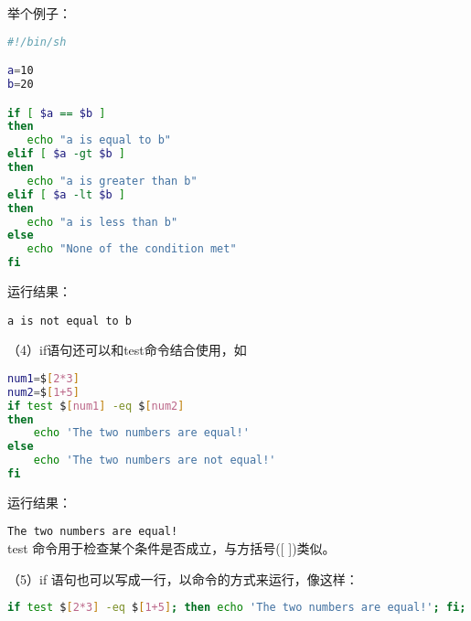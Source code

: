 举个例子：
\begin{lstlisting}[language=sh]
#!/bin/sh

a=10
b=20

if [ $a == $b ]
then
   echo "a is equal to b"
elif [ $a -gt $b ]
then
   echo "a is greater than b"
elif [ $a -lt $b ]
then
   echo "a is less than b"
else
   echo "None of the condition met"
fi
\end{lstlisting}
运行结果：

\verb|a is not equal to b|


（4）if语句还可以和test命令结合使用，如
\begin{lstlisting}[language=sh]
num1=$[2*3]
num2=$[1+5]
if test $[num1] -eq $[num2]
then
    echo 'The two numbers are equal!'
else
    echo 'The two numbers are not equal!'
fi
\end{lstlisting}
运行结果：

\verb|The two numbers are equal!|\\
test 命令用于检查某个条件是否成立，与方括号([ ])类似。

（5）if 语句也可以写成一行，以命令的方式来运行，像这样：
\begin{lstlisting}[language=sh]
if test $[2*3] -eq $[1+5]; then echo 'The two numbers are equal!'; fi;
\end{lstlisting}



